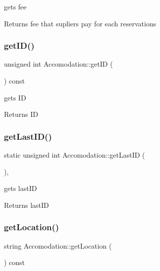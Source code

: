 gets fee 

\begin{DoxyReturn}{Returns}
fee that supliers pay for each reservations 
\end{DoxyReturn}
\hypertarget{class_accomodation_a04d05660220ad6ad31619bdf9bab28e9}{}\label{class_accomodation_a04d05660220ad6ad31619bdf9bab28e9} 
\subsubsection{\texorpdfstring{get\+I\+D()}{getID()}}
{\footnotesize\ttfamily unsigned int Accomodation\+::get\+ID (\begin{DoxyParamCaption}{ }\end{DoxyParamCaption}) const\hspace{0.3cm}{\ttfamily [inline]}}



gets ID 

\begin{DoxyReturn}{Returns}
ID 
\end{DoxyReturn}
\hypertarget{class_accomodation_a2ceca7929ed995f3fdc40e3d6b7e017c}{}\label{class_accomodation_a2ceca7929ed995f3fdc40e3d6b7e017c} 
\subsubsection{\texorpdfstring{get\+Last\+I\+D()}{getLastID()}}
{\footnotesize\ttfamily static unsigned int Accomodation\+::get\+Last\+ID (\begin{DoxyParamCaption}{ }\end{DoxyParamCaption})\hspace{0.3cm}{\ttfamily [inline]}, {\ttfamily [static]}}



gets last\+ID 

\begin{DoxyReturn}{Returns}
last\+ID 
\end{DoxyReturn}
\hypertarget{class_accomodation_a4412dad54b791d4db1ebd01176c1333e}{}\label{class_accomodation_a4412dad54b791d4db1ebd01176c1333e} 
\subsubsection{\texorpdfstring{get\+Location()}{getLocation()}}
{\footnotesize\ttfamily string Accomodation\+::get\+Location (\begin{DoxyParamCaption}{ }\end{DoxyParamCaption}) const\hspace{0.3cm}{\ttfamily [inline]}}



